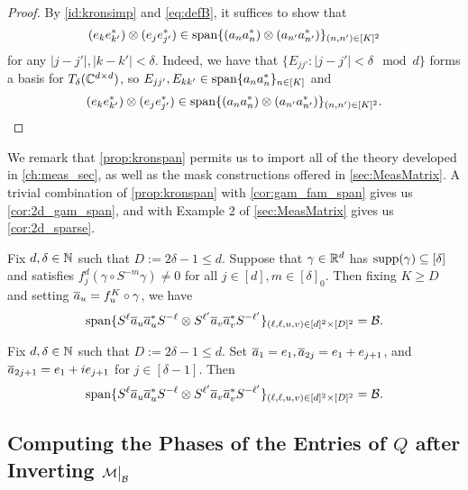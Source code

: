 \begin{proof}
  By \eqref{id:kronsimp} and \eqref{eq:defB}, it suffices to show that $$(e_k e_{k'}^*) \otimes (e_j e_{j'}^*) \in \operatorname{span}\{(a_n a_n^*) \otimes (a_{n'} a_{n'}^*)\}_{(n, n') \in [K]^2}$$ for any $|j - j'|, |k - k'| < \delta$.  Indeed, we have that $\{E_{jj'} : |j - j'| < \delta \mod d\}$ forms a basis for $T_\delta(\mathbb{C}^{d \times d})$, so $E_{j j'}, E_{k k'} \in \operatorname{span}\{a_n a_n^*\}_{n \in [K]}$ and $$(e_k e_{k'}^*) \otimes (e_j e_{j'}^*) \in \operatorname{span}\{(a_n a_n^*) \otimes (a_{n'} a_{n'}^*)\}_{(n, n') \in [K]^2}.$$
\end{proof}

We remark that \cref{prop:kronspan} permits us to import all of the theory developed in \cref{ch:meas_sec}, as well as the mask constructions offered in \cref{sec:MeasMatrix}.  A trivial combination of \cref{prop:kronspan} with \cref{cor:gam_fam_span} gives us \cref{cor:2d_gam_span}, and with Example 2 of \cref{sec:MeasMatrix} gives us \cref{cor:2d_sparse}.

\begin{corollary}
  Fix $d, \delta \in \mathbb{N}$ such that $D := 2 \delta - 1 \le d$.  Suppose that $\gamma \in \mathbb{R}^d$ has $\operatorname{supp}(\gamma) \subseteq [\delta]$ and satisfies $f_j^d(\gamma \circ S^{-m} \gamma) \neq 0$ for all $j \in [d], m \in [\delta]_0$.  Then fixing $K \ge D$ and setting $\overline{a}_u = f^K_u \circ \gamma$, we have \[\operatorname{span}\{S^\ell \overline{a}_u \overline{a}_u^* S^{-\ell} \otimes S^{\ell'} \overline{a}_v \overline{a}_v^* S^{-\ell'}\}_{(\ell, \ell, u, v) \in [d]^2 \times [D]^2} = \mathcal{B}.\]
  \label{cor:2d_gam_span}
\end{corollary}

\begin{corollary}
  Fix $d, \delta \in \mathbb{N}$ such that $D := 2 \delta - 1 \le d$.  Set $\overline{a}_1 = e_1, \overline{a}_{2j} = e_1 + e_{j+1}$, and $\overline{a}_{2j + 1} = e_1 + i e_{j+1}$ for $j \in [\delta - 1]$.  Then \[\operatorname{span}\{S^\ell \overline{a}_u \overline{a}_u^* S^{-\ell} \otimes S^{\ell'} \overline{a}_v \overline{a}_v^* S^{-\ell'}\}_{(\ell, \ell, u, v) \in [d]^2 \times [D]^2} = \mathcal{B}.\]
  \label{cor:2d_sparse}
\end{corollary}

\subsection{Computing the Phases of the Entries of $Q$ after Inverting $\mathcal{M} \big|_{\mathcal{B}}$}
\label{sec:Getphases}

